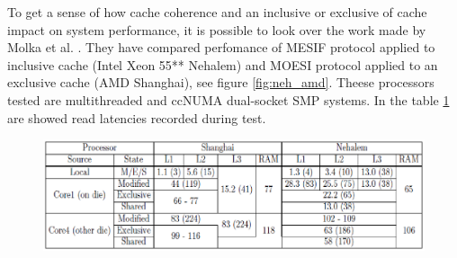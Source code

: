 To get a sense of how cache coherence and an inclusive or exclusive of cache impact on system performance, it is possible to look over the work made by 
Molka et al. \cite{molka}. They have compared perfomance of MESIF protocol applied to inclusive cache (Intel Xeon 55** Nehalem) and MOESI protocol applied 
to an exclusive cache (AMD Shanghai), see figure \ref{fig:neh_amd}. Theese processors tested are multithreaded and ccNUMA dual-socket SMP systems. 
In the table \ref{fig:tab_lat} are showed read latencies recorded during test.

\begin{figure}[htbp]
\centering
\includegraphics[width=\widefigure]{images/tab_lat.eps}
\caption{}
\label{fig:tab_lat}
\end{figure}

